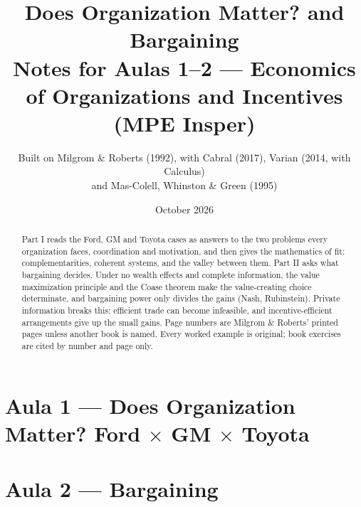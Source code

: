 \documentclass[11pt,a4paper]{article}
\title{\textbf{Does Organization Matter? and Bargaining}\\[4pt]
  \large Notes for Aulas 1--2 --- Economics of Organizations and Incentives (MPE Insper)}
\author{Built on Milgrom \& Roberts (1992), with Cabral (2017), Varian (2014, with Calculus)\\
  and Mas-Colell, Whinston \& Green (1995)}
\date{October 2026}
\begin{document}
\maketitle
\thispagestyle{empty}

\begin{abstract}
\noindent Part I reads the Ford, GM and Toyota cases as answers to the two problems every
organization faces, coordination and motivation, and then gives the mathematics of fit:
complementarities, coherent systems, and the valley between them. Part II asks what bargaining
decides. Under no wealth effects and complete information, the value maximization principle and
the Coase theorem make the value-creating choice determinate, and bargaining power only divides
the gains (Nash, Rubinstein). Private information breaks this: efficient trade can become
infeasible, and incentive-efficient arrangements give up the small gains. Page numbers are
Milgrom \& Roberts' printed pages unless another book is named. Every worked example is original;
book exercises are cited by number and page only.
\end{abstract}

\tableofcontents
\newpage

\part{Aula 1 --- Does Organization Matter? Ford $\times$ GM $\times$ Toyota}


\newpage
\part{Aula 2 --- Bargaining}

\end{document}
